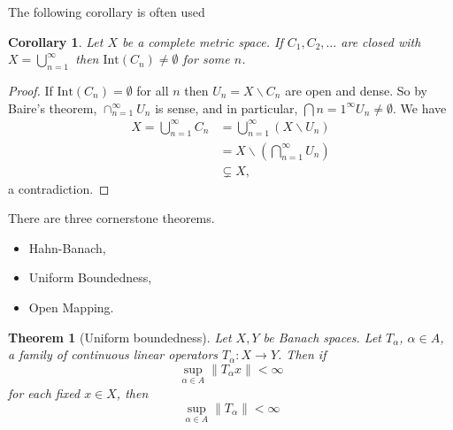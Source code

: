\documentclass[justified]{tufte-book}
\theoremstyle{plain}%
\newtheorem{thm}{Theorem}[chapter]
\newtheorem*{cor}{Corollary}
\theoremstyle{definition}
\theoremstyle{remark}
\begin{document}
The following corollary is often used
\begin{cor}
  Let $X$ be a complete metric space. If $C_1, C_2, \dots$ are closed with $X = \bigcup_{n=1}^\infty$ then $\text{Int} (C_n) \neq \emptyset$ for some $n$.
\end{cor}
\begin{proof}
  If $\text{Int}(C_n) = \emptyset$ for all $n$ then $U_n = X \backslash C_n$ are open and dense.  So by Baire's theorem, $\cap_{n=1}^\infty U_n$ is sense, and in particular, $\bigcap{n=1}^\infty U_n \neq \emptyset$. We have 
  \begin{align*}
      X  = \bigcup_{n=1}^\infty C_n &= \bigcup_{n=1}^\infty (X \backslash U_n) \\
      &= X \backslash (\bigcap_{n=1}^\infty U_n) \\
      &\subsetneq X,
  \end{align*} a contradiction.
\end{proof}

There are three cornerstone theorems. 

\begin{itemize}
  \item Hahn-Banach,
  \item Uniform Boundedness,
  \item Open Mapping.
\end{itemize}

\begin{thm}[Uniform boundedness]
  Let $X, Y$ be Banach spaces.  Let $T_\alpha$, $\alpha \in A$, a family of continuous linear operators $T_\alpha : X \rightarrow Y$.  Then if \[
      \sup_{\alpha \in A} \| T_\alpha x \| < \infty
  \] for each fixed $x \in X$, then \[
      \sup_{\alpha \in A} \| T_\alpha \| < \infty
  \]
  
\end{thm}
\end{document}
